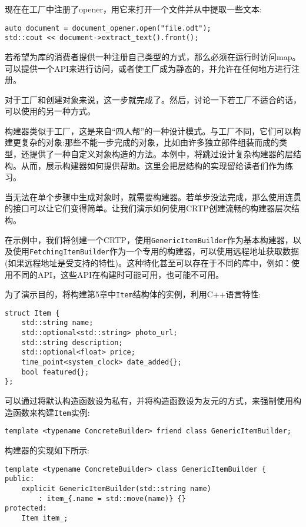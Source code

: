 现在在工厂中注册了opener，用它来打开一个文件并从中提取一些文本:

\begin{lstlisting}[style=styleCXX]
auto document = document_opener.open("file.odt");
std::cout << document->extract_text().front();
\end{lstlisting}

若希望为库的消费者提供一种注册自己类型的方式，那么必须在运行时访问map。可以提供一个API来进行访问，或者使工厂成为静态的，并允许在任何地方进行注册。

对于工厂和创建对象来说，这一步就完成了。然后，讨论一下若工厂不适合的话，可以使用的另一种方式。


构建器类似于工厂，这是来自“四人帮”的一种设计模式。与工厂不同，它们可以构建更复杂的对象:那些不能一步完成的对象，比如由许多独立部件组装而成的类型，还提供了一种自定义对象构造的方法。本例中，将跳过设计复杂构建器的层结构。从而，展示构建器如何提供帮助。这里会把层结构的实现留给读者们作为练习。

当无法在单个步骤中生成对象时，就需要构建器。若单步没法完成，那么使用连贯的接口可以让它们变得简单。让我们演示如何使用CRTP创建流畅的构建器层次结构。

在示例中，我们将创建一个CRTP，使用\texttt{GenericItemBuilder}作为基本构建器，以及使用\texttt{FetchingItemBuilder}作为一个专用的构建器，可以使用远程地址获取数据(如果远程地址是受支持的特性)。这种特化甚至可以存在于不同的库中，例如：使用不同的API，这些API在构建时可能可用，也可能不可用。

为了演示目的，将构建第5章中\texttt{Item}结构体的实例，利用C++语言特性:

\begin{lstlisting}[style=styleCXX]
struct Item {
	std::string name;
	std::optional<std::string> photo_url;
	std::string description;
	std::optional<float> price;
	time_point<system_clock> date_added{};
	bool featured{};
};
\end{lstlisting}

可以通过将默认构造函数设为私有，并将构造函数设为友元的方式，来强制使用构造函数来构建\texttt{Item}实例:

\begin{lstlisting}[style=styleCXX]
template <typename ConcreteBuilder> friend class GenericItemBuilder;
\end{lstlisting}

构建器的实现如下所示:

\begin{lstlisting}[style=styleCXX]
template <typename ConcreteBuilder> class GenericItemBuilder {
public:
	explicit GenericItemBuilder(std::string name)
		: item_{.name = std::move(name)} {}
protected:
	Item item_;
\end{lstlisting}

